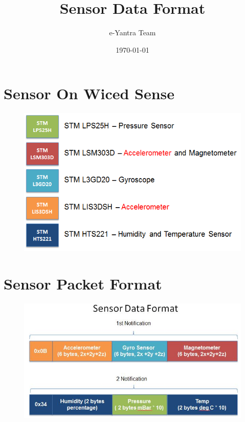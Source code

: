 \documentclass[11pt,a4paper]{article}
\begin{document}
\begin{titlepage}
\title{Sensor Data Format}
\author{e-Yantra Team}
\date{\today}
\maketitle
\end{titlepage}

\newpage
	\section{Sensor On Wiced Sense}
	
	
	\begin{figure}[h]
    \centering
	\includegraphics[scale=0.5]{Sensors.png}
	\end{figure}

\section{Sensor Packet Format}

\begin{figure}[h]
    \centering
	\includegraphics[scale=0.7]{PacketFormat.JPG}
	\end{figure}
\end{document}
